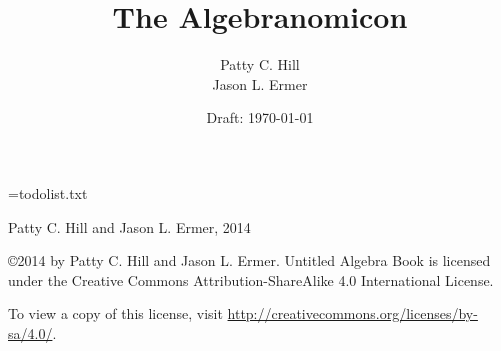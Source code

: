 \documentclass[oneside, openany]{book}
\providecommand\phantomsection{}
\begin{document}
\newwrite\outputstream
\immediate\openout\outputstream=todolist.txt


\title{{\Huge\textbf{The Algebranomicon}}}
\author{Patty C. Hill \\ Jason L. Ermer}
\date{Draft: \today}

\maketitle

\pagestyle{empty}
\null\vfill\noindent
{} Patty C. Hill and Jason L. Ermer, 2014

\copyright{2014} by Patty C. Hill and Jason L. Ermer. Untitled Algebra Book is licensed under the Creative Commons Attribution-ShareAlike 4.0 International License.

To view a copy of this license, visit \url{http://creativecommons.org/licenses/by-sa/4.0/}.
\clearpage

\frontmatter
\pagestyle{plain}

\setcounter{tocdepth}{1}
\tableofcontents



\mainmatter
\pagestyle{fancy}

\lhead{}
\rhead{\leftmark}
\cfoot{\thepage}



%















%
\end{document}

